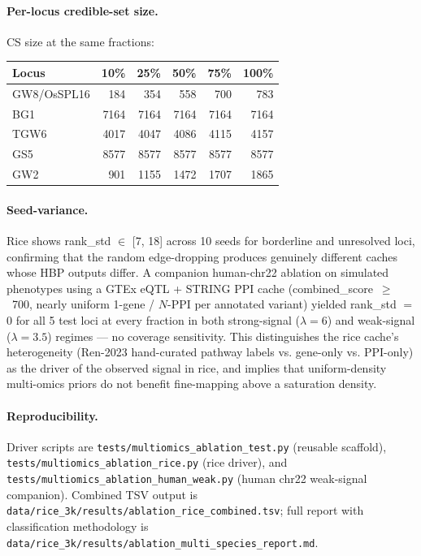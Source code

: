 \paragraph{Per-locus credible-set size.} CS size at the same fractions:

\begin{center}
\begin{tabular}{lrrrrr}
\toprule
\textbf{Locus} & \textbf{10\%} & \textbf{25\%} & \textbf{50\%} & \textbf{75\%} & \textbf{100\%} \\
\midrule
GW8/OsSPL16  &  184 &  354 &  558 &  700 &  783 \\
BG1          & 7164 & 7164 & 7164 & 7164 & 7164 \\
TGW6         & 4017 & 4047 & 4086 & 4115 & 4157 \\
GS5          & 8577 & 8577 & 8577 & 8577 & 8577 \\
GW2          &  901 & 1155 & 1472 & 1707 & 1865 \\
\bottomrule
\end{tabular}
\end{center}

\paragraph{Seed-variance.} Rice shows rank\_std $\in$ [7, 18] across 10
seeds for borderline and unresolved loci, confirming that the random
edge-dropping produces genuinely different caches whose HBP outputs
differ. A companion human-chr22 ablation on simulated phenotypes using a
GTEx eQTL + STRING PPI cache (combined\_score~$\geq$~700, nearly uniform
1-gene / $N$-PPI per annotated variant) yielded rank\_std $=$ 0 for all
5 test loci at every fraction in both strong-signal ($\lambda=6$) and
weak-signal ($\lambda=3.5$) regimes --- no coverage sensitivity. This
distinguishes the rice cache's heterogeneity (Ren-2023 hand-curated
pathway labels vs. gene-only vs. PPI-only) as the driver of the
observed signal in rice, and implies that uniform-density multi-omics
priors do not benefit fine-mapping above a saturation density.

\paragraph{Reproducibility.} Driver scripts are
\texttt{tests/multiomics\_ablation\_test.py} (reusable scaffold),
\texttt{tests/multiomics\_ablation\_rice.py} (rice driver), and
\texttt{tests/multiomics\_ablation\_human\_weak.py} (human chr22
weak-signal companion). Combined TSV output is
\texttt{data/rice\_3k/results/ablation\_rice\_combined.tsv};
full report with classification methodology is
\texttt{data/rice\_3k/results/ablation\_multi\_species\_report.md}.

